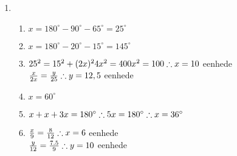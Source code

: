 \begin{eocsolutions}{}
{\begin{enumerate}[itemsep=5pt, label=\textbf{\arabic*}. ]
\begin{enumerate}[noitemsep, label=\textbf{(\alph*)} ]
\item Fals - 'n trapesium het net een paar teenoorstande ewewydig sye.%
\item Waar.%
\item Waar.%
\item Fals - twee aangrensende sye van 'n ruit is gelyk in lengte.%
\item Waar.%
\item Waar.%
\item Waar.%
\item Fals - die hoeklyne van 'n ruit is nie gelyk in lengte nie.%
\item Fals - net een hoeklyn van 'n vlieër halveer twee pare binnehoeke.%
	  \end{enumerate}
\item %
	  \begin{enumerate}[noitemsep, label=\textbf{(\alph*)} ]
	\item $x=180^{\circ}-90^{\circ}-65^{\circ}=25^{\circ}$
\item $x=180^{\circ}-20^{\circ}-15^{\circ}=145^{\circ}$
\item $25^2 = 15^2 + (2x)^2\\
4x^2 = 400\\
x^2 = 100\\
\therefore x=10$ eenhede\\
$\frac{x}{2x} = \frac{y}{25}\\
\therefore y=12,5$ eenhede
\item $x=60^{\circ}$
\item $x+x+3x = 180^{\circ}\\
\therefore 5x = 180^{\circ}\\ \therefore x=36^{\circ}$
\item $
\frac{x}{9} = \frac{8}{12}\\
\therefore x=6$ eenhede\\
$\frac{y}{12} = \frac{7.5}{9} \\ 
\therefore y=10$ eenhede
	  \end{enumerate}


\end{enumerate}}
\end{eocsolutions}
